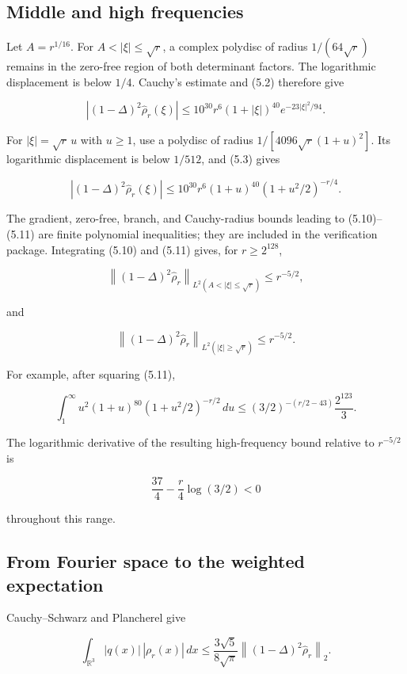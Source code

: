\documentclass[11pt]{article}
\begin{document}
\subsection{Middle and high frequencies}

Let $A=r^{1/16}$.  For $A<|\xi|\le\sqrt r$, a complex polydisc of radius $1/(64\sqrt r)$ remains in the zero-free region of both determinant factors. The logarithmic displacement is below $1/4$.  Cauchy's estimate and (5.2) therefore give

\[
|(1-\Delta)^2\widehat\rho_r(\xi)|
\le10^{30}r^6(1+|\xi|)^{40}e^{-23|\xi|^2/94}.           \tag{5.10}
\]

For $|\xi|=\sqrt r\,u$ with $u\ge1$, use a polydisc of radius $1/[4096\sqrt r(1+u)^2]$.  Its logarithmic displacement is below $1/512$, and (5.3) gives

\[
|(1-\Delta)^2\widehat\rho_r(\xi)|
\le10^{30}r^6(1+u)^{40}(1+u^2/2)^{-r/4}.                \tag{5.11}
\]

The gradient, zero-free, branch, and Cauchy-radius bounds leading to (5.10)--(5.11) are finite polynomial inequalities; they are included in the verification package.  Integrating (5.10) and (5.11) gives, for $r\ge2^{128}$,

\[
\left\|(1-\Delta)^2\widehat\rho_r\right\|_{L^2(
A<|\xi|\le\sqrt r)}\le r^{-5/2},                        \tag{5.12}
\]

and

\[
\left\|(1-\Delta)^2\widehat\rho_r\right\|_{L^2(
|\xi|\ge\sqrt r)}\le r^{-5/2}.                         \tag{5.13}
\]

For example, after squaring (5.11),

\[
\int_1^\infty u^2(1+u)^{80}(1+u^2/2)^{-r/2}\,du
\le(3/2)^{-(r/2-43)}\frac{2^{123}}3.                   \tag{5.14}
\]

The logarithmic derivative of the resulting high-frequency bound relative to $r^{-5/2}$ is

\[
\frac{37}{4}-\frac r4\log(3/2)<0                       \tag{5.15}
\]

throughout this range.

\subsection{From Fourier space to the weighted expectation}

Cauchy--Schwarz and Plancherel give

\[
\int_{\mathbb R^3}|q(x)|\,|\rho_r(x)|\,dx
\le\frac{3\sqrt5}{8\sqrt\pi}
\left\|(1-\Delta)^2\widehat\rho_r\right\|_2.          \tag{5.16}
\]
\end{document}

